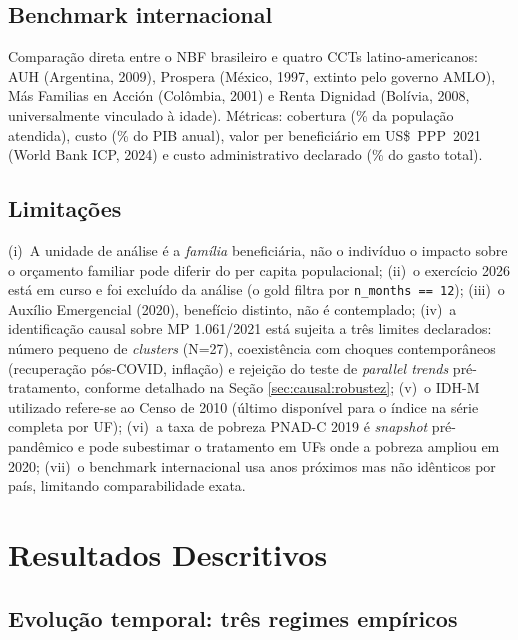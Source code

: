 \documentclass[12pt,a4paper,oneside]{article}
\begin{document}
\subsection{Benchmark internacional}

Comparação direta entre o NBF brasileiro e quatro CCTs
latino-americanos: AUH (Argentina, 2009\textendash), Prospera
(México, 1997, extinto pelo governo
AMLO), Más Familias en Acción (Colômbia, 2001\textendash) e
Renta Dignidad (Bolívia, 2008\textendash, universalmente vinculado
à idade). Métricas: cobertura (\% da população atendida), custo
(\% do PIB anual), valor per beneficiário em US\$~PPP~2021
(World Bank ICP, 2024) e custo administrativo declarado
(\% do gasto total).

\subsection{Limitações}

(i)~A unidade de análise é a \textit{família} beneficiária, não o
indivíduo \textemdash{} o impacto sobre o orçamento familiar pode
diferir do per capita populacional;
(ii)~o exercício 2026 está em curso e foi excluído da análise (o
gold filtra por \texttt{n\_months == 12});
(iii)~o Auxílio Emergencial (2020), benefício
distinto, não é contemplado;
(iv)~a identificação causal sobre MP 1.061/2021 está sujeita a
três limites declarados: número pequeno de \textit{clusters}
(N=27), coexistência com choques contemporâneos (recuperação
pós-COVID, inflação) e rejeição do teste de \textit{parallel trends}
pré-tratamento, conforme detalhado na Seção
\ref{sec:causal:robustez};
(v)~o IDH-M utilizado refere-se ao Censo de 2010 (último
disponível para o índice na série completa por UF);
(vi)~a taxa de pobreza PNAD-C 2019 é \textit{snapshot}
pré-pandêmico e pode subestimar o tratamento em UFs onde a
pobreza ampliou em 2020;
(vii)~o benchmark internacional usa anos próximos mas não
idênticos por país, limitando comparabilidade exata.


\section{Resultados Descritivos}\label{sec:resultados}


\subsection{Evolução temporal: três regimes empíricos}
\end{document}
